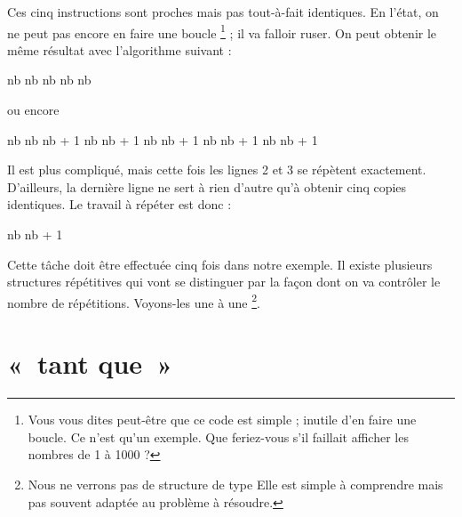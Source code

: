 		Ces cinq instructions sont proches mais pas tout-à-fait identiques. 
		En l'état, on ne peut pas encore en faire une boucle%
		\footnote{%
			Vous vous dites peut-être que ce code est simple ;
			inutile d'en faire une boucle.
			Ce n'est qu'un exemple.
			Que feriez-vous s'il faillait afficher les nombres
			de 1 à 1000 ?
		} ;
		il va falloir ruser.
		On peut obtenir le même résultat avec l'algorithme suivant :

		\begin{minipage}{4cm}
		\begin{LDA}
		\Let nb 
		\Let nb 
		\Let nb 
		\Let nb 
		\Let nb 
		\end{LDA}
		\end{minipage}
		\quad ou encore \quad
		\begin{minipage}{4cm}
		\begin{LDA}[1]
		\Let nb \Gets 1
		\Write{nb}
		\Let nb \Gets nb + 1
		\Write{nb}
		\Let nb \Gets nb + 1
		\Write{nb}
		\Let nb \Gets nb + 1
		\Write{nb}
		\Let nb \Gets nb + 1
		\Write{nb}
		\Let nb \Gets nb + 1
		\end{LDA}
		\end{minipage}
		
		Il est plus compliqué,
		mais cette fois les lignes 2 et 3 se répètent exactement.
		D'ailleurs, la dernière ligne ne sert à rien d'autre qu'à
		obtenir cinq copies identiques.
		Le travail à répéter est donc :

		\begin{LDA}
		\Let nb \Gets nb + 1
		\end{LDA}

		Cette tâche doit être effectuée cinq fois dans notre exemple.
		Il existe plusieurs structures répétitives
		qui vont se distinguer par la façon dont on va
		contrôler le nombre de répétitions.
		Voyons-les une à une%
		\footnote{%
			Nous ne verrons pas de structure de type
			Elle est simple à comprendre
			mais pas souvent adaptée au problème à résoudre.
		}.

\clearpage
\section{«~tant que~»}
	
